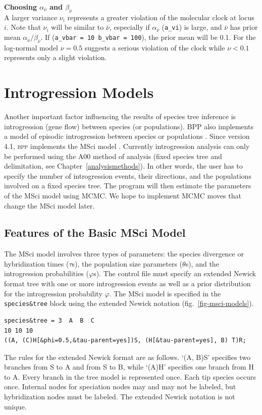 \documentclass[a4paper]{book}
\numberwithin{equation}{section} \renewcommand{\baselinestretch}{0.55}
\begin{document}
\begin{mdframed}
  \textbf{Choosing $\alpha_{\bar{\nu}}$ and $\beta_{\bar{\nu}}$}\\
  A larger variance $\nu_i$ represents a greater violation of the
  molecular clock at locus $i$.  Note that $\nu_i$ will be similar to
  $\bar\nu$, especially if $\alpha_{\bar{\nu}}$ (\texttt{a\_vi}) is
  large, and $\bar\nu$ has prior mean
  $\alpha_{\bar{\nu}}/\beta_{\bar{\nu}}$.  If (\texttt{a\_vbar = 10
    b\_vbar = 100}), the prior mean will be 0.1.  For the log-normal
  model $\nu = 0.5$ suggests a serious violation of the clock while
  $\nu < 0.1$ represents only a slight violation.
\end{mdframed}

\chapter{Introgression Models}\label{introgression}
Another important factor influencing the results of species tree
inference is introgression (gene flow) between species (or
populations). BPP also implements a model of episodic introgression
between species or populations \cite{Flouri2020a}.  Since version 4.1,
\textsc{bpp} implements the MSci model \cite{Flouri2020a}.  Currently
introgression analysis can only be performed using the A00 method of
analysis (fixed species tree and delimitation, see
Chapter~\ref{analysismethods}).  In other words, the user has to
specify the number of introgression events, their directions, and the
populations involved on a fixed species tree.  The program will then
estimate the parameters of the MSci model using MCMC.  We hope to
implement MCMC moves that change the MSci model later.

\section{Features of the Basic MSci Model}
The MSci model involves three types of parameters: the species
divergence or hybridization times ($\tau$s), the population size
parameters ($\theta$s), and the introgression probabilities
($\varphi$s). The control file must specify an extended Newick format
tree with one or more introgression events as well as a prior
distribution for the introgression probability $\varphi$. The MSci
model is specified in the \texttt{species\&tree} block using the
extended Newick notation \citep{Cardona2008}
(fig.~\ref{fig-msci-models}).
\begin{verbatim}
species&tree = 3  A  B  C
10 10 10
((A, (C)H[&phi=0.5,&tau-parent=yes])S, (H[&tau-parent=yes], B) T)R;
\end{verbatim}
The rules for the extended Newick format are as follows.  `(A, B)S'
specifies two branches from S to A and from S to B, while ‘(A)H’
specifies one branch from H to A.  Every branch in the tree model is
represented once.  Each tip species occurs once.  Internal nodes for
speciation nodes may and may not be labeled, but hybridization nodes
must be labeled.  The extended Newick notation is not unique.
\end{document}
